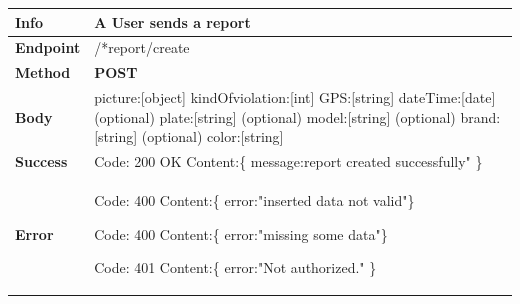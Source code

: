 


\begin{table}[H]
\begin{tabular}{|l|p{}|}
\hline
\textbf{Info}             & A User sends a report                                                                   \\ \hline
\textbf{Endpoint}    &  /*report/create \\ \hline
\textbf{Method}         &   \textbf{POST}                                                                            \\ \hline

\textbf{Body}  & picture:[object]\newline
kindOfviolation:[int]\newline
GPS:[string]\newline
dateTime:[date]\newline
(optional) plate:[string]\newline
(optional) model:[string]\newline
(optional) brand:[string]\newline
(optional) color:[string]\newline
                    \\ \hline
                    
\textbf{Success} &  Code: 200 OK \newline
                    Content:\{\newline 
                    message:report created successfully"\newline
                    \}\\ \hline
\textbf{Error} &  Code: 400 \newline
                  Content:\{\newline
                  error:"inserted data not valid"\newline\}\newline
                  
                  Code: 400 \newline
                  Content:\{\newline
                  error:"missing some data"\newline\}\newline
                  
                  Code: 401 \newline
                  Content:\{\newline
                  error:"Not authorized." \newline\}
                  
                \\\hline

\end{tabular}
\end{table}



